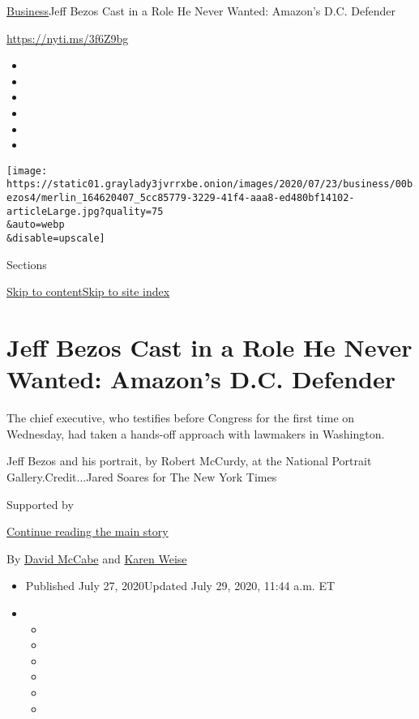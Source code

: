 \href{/section/business}{Business}\textbar{}Jeff Bezos Cast in a Role He
Never Wanted: Amazon's D.C. Defender

\url{https://nyti.ms/3f6Z9bg}

\begin{itemize}
\item
\item
\item
\item
\item
\item
\end{itemize}

\texttt{[image: https://static01.graylady3jvrrxbe.onion/images/2020/07/23/business/00bezos4/merlin\_164620407\_5cc85779-3229-41f4-aaa8-ed480bf14102-articleLarge.jpg?quality=75\\\&auto=webp\\\&disable=upscale]}

Sections

\protect\hyperlink{site-content}{Skip to
content}\protect\hyperlink{site-index}{Skip to site index}

\hypertarget{jeff-bezos-cast-in-a-role-he-never-wanted-amazons-dc-defender}{%
\section{Jeff Bezos Cast in a Role He Never Wanted: Amazon's D.C.
Defender}\label{jeff-bezos-cast-in-a-role-he-never-wanted-amazons-dc-defender}}

The chief executive, who testifies before Congress for the first time on
Wednesday, had taken a hands-off approach with lawmakers in Washington.

Jeff Bezos and his portrait, by Robert McCurdy, at the National Portrait
Gallery.Credit...Jared Soares for The New York Times

Supported by

\protect\hyperlink{after-sponsor}{Continue reading the main story}

By \href{https://www.nytimes3xbfgragh.onion/by/david-mccabe}{David
McCabe} and
\href{https://www.nytimes3xbfgragh.onion/by/karen-weise}{Karen Weise}

\begin{itemize}
\item
  Published July 27, 2020Updated July 29, 2020, 11:44 a.m. ET
\item
  \begin{itemize}
  \item
  \item
  \item
  \item
  \item
  \item
  \end{itemize}
\end{itemize}

